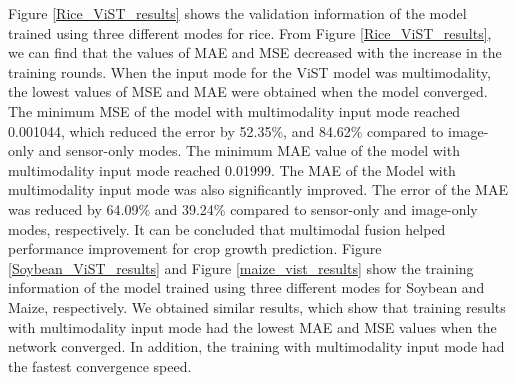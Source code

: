 \documentclass[acmsmall,manuscript, screen, review]{acmart}
\begin{document}
Figure \ref{Rice_ViST_results} shows the validation information of the model trained using three different modes for rice. From Figure \ref{Rice_ViST_results}, we can find that the values of MAE and MSE decreased with the increase in the training rounds. When the input mode for the ViST model was multimodality, the lowest values of MSE and MAE were obtained when the model converged. The minimum MSE of the model with multimodality input mode reached 0.001044, which reduced the error by 52.35\%, and 84.62\% compared to image-only and sensor-only modes. The minimum MAE value of the model with multimodality input mode  reached 0.01999. The MAE of the Model with multimodality input mode was also significantly improved. The error of the MAE was reduced by 64.09\% and 39.24\% compared to sensor-only and image-only modes, respectively. It can be concluded that multimodal fusion helped performance improvement for crop growth prediction. Figure \ref{Soybean_ViST_results} and Figure \ref{maize_vist_results} show the training information of the model trained using three different modes for Soybean and Maize, respectively. We obtained similar results, which show that training results with multimodality input mode had the lowest MAE and MSE values when the network converged. In addition, the training with multimodality input mode had the fastest convergence speed.
\end{document}
